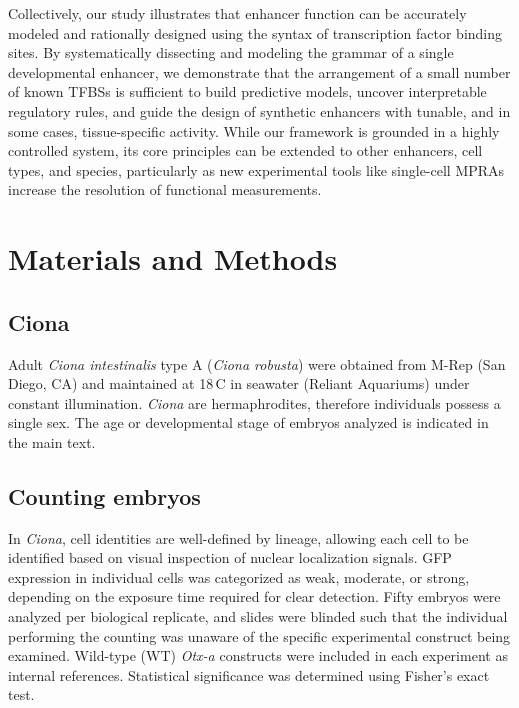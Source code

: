 Collectively, our study illustrates that enhancer function can be accurately modeled and rationally designed using the syntax of transcription factor binding sites. By systematically dissecting and modeling the grammar of a single developmental enhancer, we demonstrate that the arrangement of a small number of known TFBSs is sufficient to build predictive models, uncover interpretable regulatory rules, and guide the design of synthetic enhancers with tunable, and in some cases, tissue-specific activity. While our framework is grounded in a highly controlled system, its core principles can be extended to other enhancers, cell types, and species, particularly as new experimental tools like single-cell MPRAs \cite{Zhao2023-ql,Lalanne2024-ts} increase the resolution of functional measurements.

\section{Materials and Methods}

\subsection{Ciona}
Adult \textit{Ciona intestinalis} type A (\textit{Ciona robusta}) were obtained from M-Rep (San Diego, CA) and maintained at 18\,\textdegree C in seawater (Reliant Aquariums) under constant illumination. \textit{Ciona} are hermaphrodites, therefore individuals possess a single sex. The age or developmental stage of embryos analyzed is indicated in the main text.

\subsection{Counting embryos}
In \textit{Ciona}, cell identities are well-defined by lineage, allowing each cell to be identified based on visual inspection of nuclear localization signals. GFP expression in individual cells was categorized as weak, moderate, or strong, depending on the exposure time required for clear detection. Fifty embryos were analyzed per biological replicate, and slides were blinded such that the individual performing the counting was unaware of the specific experimental construct being examined. Wild-type (WT) \textit{Otx-a} constructs were included in each experiment as internal references. Statistical significance was determined using Fisher’s exact test.

